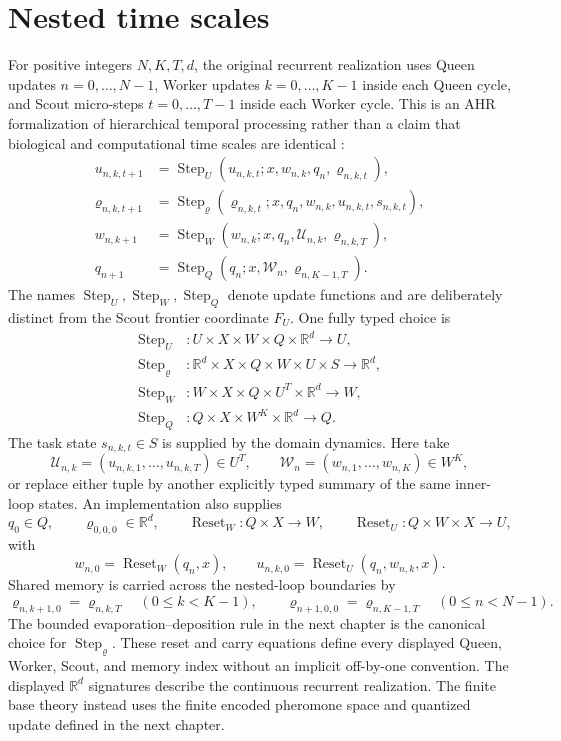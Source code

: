 \documentclass[11pt,oneside]{book}
\theoremstyle{remark}
\begin{document}
\section{Nested time scales}

For positive integers $N,K,T,d$, the original recurrent realization uses Queen
updates $n=0,\ldots,N-1$, Worker updates $k=0,\ldots,K-1$ inside each Queen
cycle, and Scout micro-steps $t=0,\ldots,T-1$ inside each Worker cycle. This is
an AHR
formalization of hierarchical temporal processing rather than a claim that
biological and computational time scales are identical
\cite{WangHRM2025,KiebelTimescales2008}:
\begin{align}
u_{n,k,t+1}&=\operatorname{Step}_U
(u_{n,k,t};x,w_{n,k},q_n,\varrho_{n,k,t}),\\
\varrho_{n,k,t+1}&=\operatorname{Step}_{\varrho}
(\varrho_{n,k,t};x,q_n,w_{n,k},u_{n,k,t},s_{n,k,t}),\\
w_{n,k+1}&=\operatorname{Step}_W
(w_{n,k};x,q_n,\mathcal U_{n,k},\varrho_{n,k,T}),\\
q_{n+1}&=\operatorname{Step}_Q
(q_n;x,\mathcal W_n,\varrho_{n,K-1,T}).
\end{align}
The names $\operatorname{Step}_U,\operatorname{Step}_W,\operatorname{Step}_Q$
denote update functions and are deliberately distinct from the Scout frontier
coordinate $F_U$. One fully typed choice is
\begin{align*}
\operatorname{Step}_U&:U\times X\times W\times Q\times\mathbb R^d\to U,\\
\operatorname{Step}_{\varrho}
&:\mathbb R^d\times X\times Q\times W\times U\times S\to\mathbb R^d,\\
\operatorname{Step}_W&:W\times X\times Q\times U^T\times\mathbb R^d\to W,\\
\operatorname{Step}_Q&:Q\times X\times W^K\times\mathbb R^d\to Q.
\end{align*}
The task state $s_{n,k,t}\in S$ is supplied by the domain dynamics. Here take
\[
\mathcal U_{n,k}=(u_{n,k,1},\ldots,u_{n,k,T})\in U^T,
\qquad
\mathcal W_n=(w_{n,1},\ldots,w_{n,K})\in W^K,
\]
or replace either tuple by another explicitly typed summary of the same
inner-loop states. An implementation also supplies
\[
q_0\in Q,\qquad \varrho_{0,0,0}\in\mathbb R^d,\qquad
\operatorname{Reset}_W:Q\times X\to W,\qquad
\operatorname{Reset}_U:Q\times W\times X\to U,
\]
with
\[
w_{n,0}=\operatorname{Reset}_W(q_n,x),
\qquad
u_{n,k,0}=\operatorname{Reset}_U(q_n,w_{n,k},x).
\]
Shared memory is carried across the nested-loop boundaries by
\[
\varrho_{n,k+1,0}=\varrho_{n,k,T}\quad(0\le k<K-1),
\qquad
\varrho_{n+1,0,0}=\varrho_{n,K-1,T}\quad(0\le n<N-1).
\]
The bounded evaporation--deposition rule in the next chapter is the canonical
choice for $\operatorname{Step}_{\varrho}$. These reset and carry equations
define every displayed Queen, Worker, Scout, and memory index without an
implicit off-by-one convention.
The displayed $\mathbb R^d$ signatures describe the continuous recurrent
realization. The finite base theory instead uses the finite encoded pheromone
space and quantized update defined in the next chapter.
\end{document}
